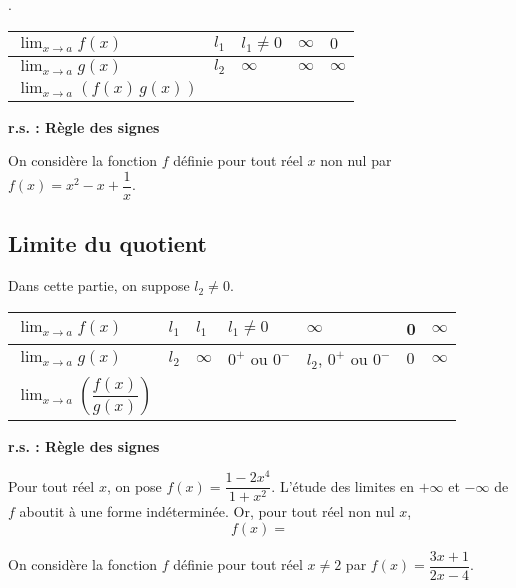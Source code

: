 \documentclass[11pt,fleqn, openany]{book} %
\begin{document}
\begin{proposition}.
\begin{center}

\begin{tabularx}{\linewidth}{|l|X|X|X|X|}
\hline
$\displaystyle \lim_{x \to a} f(x)$ & $l_1 $ & $l_1 \neq 0$ & $\infty$ & $0$ \\
\hline
$\displaystyle \lim_{x \to a} g(x)$ & $l_2$ & $\infty$ &  $\infty$ & $\infty$ \\
\hline
$\displaystyle \lim_{x \to a} (f(x)\,g(x))$ &  &  &  &  \\
\hline
\end{tabularx}

 \textbf{r.s. : Règle des signes}
 \end{center} \vspace{-1cm}
\end{proposition}

\begin{example}On considère la fonction $f$ définie pour tout réel $x$ non nul par $f(x)=x^2-x+\dfrac{1}{x}$.
\vskip120pt

\end{example}

\subsection{Limite du quotient}

\begin{proposition} Dans cette partie, on suppose $l_2 \neq 0$.
\begin{center}

\begin{tabularx}{\linewidth}{|l|X|X|X|X|X|X|}
\hline
$\displaystyle \lim_{x \to a} f(x)$ & $l_1 $ & $l_1$ & $l_1 \neq 0$ & $\infty$ & 0 & $\infty$ \\
\hline
$\displaystyle \lim_{x \to a} g(x)$ & $l_2$ & $\infty$ &  $0^+$ ou $0^-$ & $l_2$, $0^+$ ou $0^-$  & $0$ & $\infty$ \\
\hline
$\displaystyle \lim_{x \to a} \left(\dfrac{f(x)}{g(x)}\right)$ &  &  &  &  & &  \\
\hline
\end{tabularx}

 \textbf{r.s. : Règle des signes}
 \end{center} \vspace{-1cm}
\end{proposition}

\begin{example}Pour tout réel $x$, on pose $f(x)=\dfrac{1-2x^4}{1+x^2}$. L'étude des limites en $+\infty$ et $-\infty$ de $f$ aboutit à une forme indéterminée. Or, pour tout réel non nul $x$,
\[f(x)= \]

\vskip80pt
\end{example}
\newpage
\begin{example}On considère la fonction $f$ définie pour tout réel $x\neq 2$ par $f(x)=\dfrac{3x+1}{2x-4}$.

\vskip100pt

\end{example}
\end{document}
